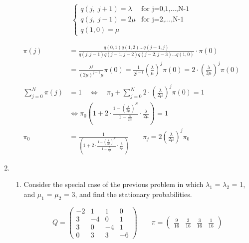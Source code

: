 \documentclass[12pt]{article}
\begin{document}
\begin{enumerate}
$$\begin{cases}
q(j,\;j+1) = \lambda &\text{for j=0,1,...,N-1}\\
q(j,\;j-1) = 2\mu &\text{for j=2,...,N-1}\\
q(1,0) = \mu
\end{cases}$$

\begin{align}
    \pi(j) &= \frac{q(0,1)q(1,2)\ldots q(j-1,j)}{q(j,j-1)q(j-1,j-2)q(j-2,j-3)\ldots q(1,0)}\cdot \pi(0) \nonumber \\
    &= \frac{\lambda^j}{(2\mu)^{j-1}\mu}\pi(0) = \frac{1}{2^{j-1}} \left(\frac{\lambda}{\mu}\right)^j \pi(0)
    =2\cdot \left(\frac{\lambda}{2\mu}\right)^j \pi(0)    \nonumber\\
    \nonumber \\
    \sum\limits_{j=0}^N \pi(j) &= 1 \quad\Leftrightarrow\quad
    \pi_0 + \sum\limits_{j=0}^N 2\cdot \left(\frac{\lambda}{2\mu}\right)^j \pi(0) =1 \nonumber \\
    &\Leftrightarrow \pi_0\left(1+2\cdot\frac{1-\left(\frac{\lambda}{2\mu}\right)^N}{1-\frac{\lambda}{2\mu}}\cdot \frac{\lambda}{2\mu}     \right)= 1 \nonumber \\
    \pi_0&= \frac{1}{\left(1+2\cdot\frac{1-\left(\frac{\lambda}{2\mu}\right)^N}{1-\frac{\lambda}{2\mu}}\cdot \frac{\lambda}{2\mu}     \right)}\qquad
    \pi_j= 2\left(\frac{\lambda}{2\mu}\right)^j \pi_0 \nonumber 
\end{align}


\newpage
\item 
\begin{enumerate}[label=(\alph*)]
    \item Consider the special case of the previous problem in which $\lambda_1$ = $\lambda_2$ = 1, and $\mu_1$ = $\mu_2$ = 3, and find the stationary probabilities.
    
    $$Q=\begin{pmatrix}
    -2&1&1&0 \\ 
    3&-4&0&1\\
    3&0&-4&1\\ 
    0&3&3&-6
    \end{pmatrix}\qquad
    \pi = \begin{pmatrix}
    \frac{9}{16}&\frac{3}{16}&\frac{3}{16}&\frac{1}{16}
    \end{pmatrix}$$
    \hfill{}
    

\end{enumerate}
\end{enumerate}
\end{document}
